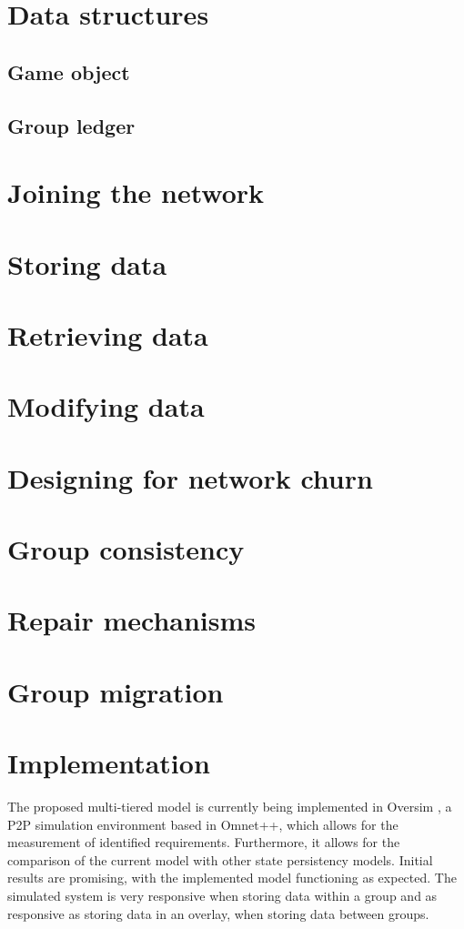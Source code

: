     \section{Data structures}

        \subsection{Game object}

        \subsection{Group ledger}

    \section{Joining the network}

    \section{Storing data}

    \section{Retrieving data}

    \section{Modifying data}

    \section{Designing for network churn}

    \section{Group consistency}

    \section{Repair mechanisms}

    \section{Group migration}

    \section{Implementation}
    The proposed multi-tiered model is currently being implemented in Oversim \cite{OverSim_2007}, a P2P simulation environment based in Omnet++, which
allows for the measurement of identified requirements. Furthermore, it allows for the comparison of the current model with other state persistency
models. Initial results are promising, with the implemented model functioning as expected. The simulated system is very responsive when storing data
within a group and as responsive as storing data in an overlay, when storing data between groups.

